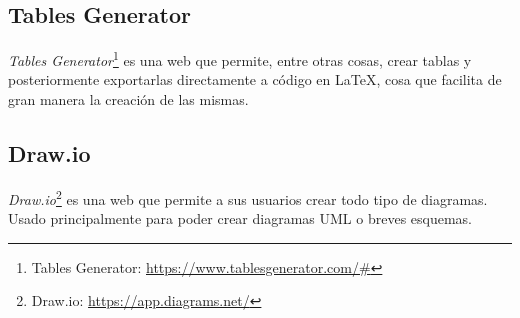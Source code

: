 \subsection{Tables Generator}
\emph{Tables Generator}\footnote{Tables Generator: \url{https://www.tablesgenerator.com/\#}} es una web que permite, entre otras cosas, crear tablas y posteriormente
exportarlas directamente a código en \LaTeX, cosa que facilita de gran manera la creación de las mismas.

\subsection{Draw.io}
\emph{Draw.io}\footnote{Draw.io: \url{https://app.diagrams.net/}} es una web que permite a sus usuarios crear todo tipo de diagramas. Usado principalmente para poder crear diagramas UML o breves esquemas.

